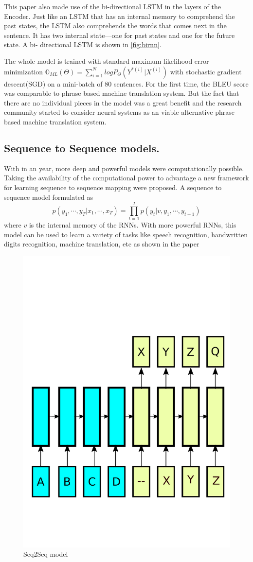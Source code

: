\documentclass[a4paper]{article}
\begin{document}
This paper  also made  use of  the  bi-directional  LSTM  in  the layers  of the
Encoder. Just like  an  LSTM that has an internal memory to comprehend  the past
states, the LSTM also comprehends the words that comes next in the sentence.  It
has two internal state---one for past states and one for the future state. A bi-
directional LSTM is shown in \ref{fig:birnn}.

The whole model is trained with standard maximum-likelihood  error  minimization
$\mathbb{O}_{ML}(\Theta) = \sum_{i=1}^N log P_\Theta(Y^{*(i)} |  X^{(i)}) $ with
stochastic gradient  descent(SGD) on a mini-batch of 80 sentences. For the first
time, the BLEU score was comparable to phrase based machine  translation system.
But  the fact  that there  are  no  individual pieces  in the  model was a great
benefit and the  research  community started to  consider  neural systems as  an
viable alternative phrase based machine translation system.


\subsection{Sequence  to Sequence models.}
\label{sec:seq}  With  in  an  year,  more   deep   and   powerful  models  were
computationally possible. Taking the availability of the computational power  to
advantage  a  new  framework  for  learning  sequence  to sequence  mapping were
proposed. A sequence to sequence model formulated as $$ p(y_1, \cdots, y_T| x_1,
\cdots, x_T) =  \prod_{t=1}^{T} p(y_t| v, y_1,  \cdots,  y_{t-1})$$ where $v$ is
the internal memory of the RNNs. With more powerful RNNs, this model can be used
to  learn a  variety  of  tasks  like  speech  recognition,  handwritten  digits
recognition,   machine   translation,    etc    as   shown    in    the    paper
\cite{sutskever2014sequence}


\begin{figure}
  \centering
  \includegraphics[width=.49\linewidth]{img/seq2seq.pdf}
  \caption{ Seq2Seq model}
  \label{fig:seq}
\end{figure}
\end{document}
